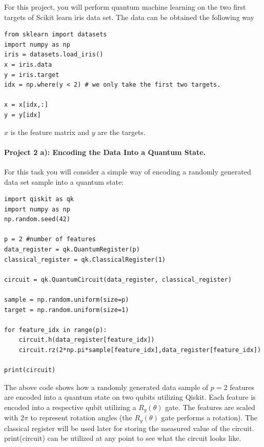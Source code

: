 \documentclass[%
oneside,                 %
final,                   %
10pt]{article}
\begin{document}
For this project, you will perform quantum machine learning on the two first targets of Scikit learn iris data set. The data can be obtained the following way











\begin{verbatim}
from sklearn import datasets
import numpy as np
iris = datasets.load_iris()
x = iris.data
y = iris.target
idx = np.where(y < 2) # we only take the first two targets.

x = x[idx,:]
y = y[idx]

\end{verbatim}

$x$ is the feature matrix and $y$ are the targets.

\paragraph{Project 2 a): Encoding the Data Into a Quantum State.}
For this task you will consider a simple way of encoding a randomly generated data set sample into a quantum state:




















\begin{verbatim}
import qiskit as qk
import numpy as np
np.random.seed(42)

p = 2 #number of features
data_register = qk.QuantumRegister(p)
classical_register = qk.ClassicalRegister(1)

circuit = qk.QuantumCircuit(data_register, classical_register)

sample = np.random.uniform(size=p)
target = np.random.uniform(size=1)

for feature_idx in range(p):
    circuit.h(data_register[feature_idx])
    circuit.rz(2*np.pi*sample[feature_idx],data_register[feature_idx])

print(circuit)

\end{verbatim}


The above code shows how a randomly generated data sample of $p=2$
features are encoded into a quantum state on two qubits utilizing
Qiskit. Each feature is encoded into a respective qubit utilizing a
$R_y(\theta)$ gate. The features are scaled with $2\pi$ to represent
rotation angles (the $R_y(\theta)$ gate performs a rotation). The
classical register will be used later for storing the measured value
of the circuit.  print(circuit) can be utilized at any point to see
what the circuit looks like.
\end{document}
